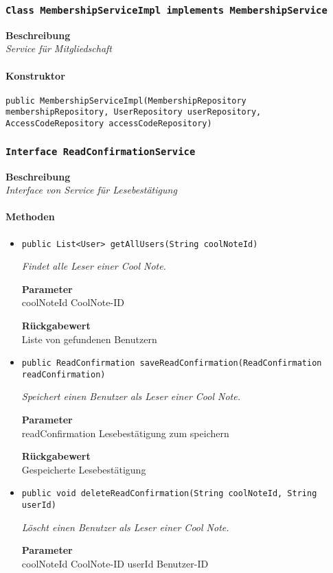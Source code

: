     \subsubsection{\texttt{Class MembershipServiceImpl implements MembershipService}}
    \textbf{Beschreibung} \\
    \textit{Service für Mitgliedschaft}
    \paragraph*{Konstruktor}
    \texttt{public MembershipServiceImpl(MembershipRepository membershipRepository, UserRepository userRepository, AccessCodeRepository accessCodeRepository)}
    \subsubsection{\texttt{Interface ReadConfirmationService}}
    \textbf{Beschreibung} \\
    \textit{Interface von Service für Lesebestätigung}
    \paragraph*{Methoden}
    \begin{itemize}
    	\item{\texttt{public List<User> getAllUsers(String coolNoteId)}}
    	
    	\textit{Findet alle Leser einer Cool Note.}
    	
    	\textbf{Parameter} \\
    	coolNoteId CoolNote-ID
    	
    	\textbf{Rückgabewert} \\
    	Liste von gefundenen Benutzern        \item{\texttt{public ReadConfirmation saveReadConfirmation(ReadConfirmation readConfirmation)}}
    	
    	\textit{Speichert einen Benutzer als Leser einer Cool Note.}
    	
    	\textbf{Parameter} \\
    	readConfirmation Lesebestätigung zum speichern
    	
    	\textbf{Rückgabewert} \\
    	Gespeicherte Lesebestätigung        \item{\texttt{public void deleteReadConfirmation(String coolNoteId, String userId)}}
    	
    	\textit{Löscht einen Benutzer als Leser einer Cool Note.}
    	
    	\textbf{Parameter} \\
    	coolNoteId CoolNote-ID
    	userId Benutzer-ID
    	
    	
    \end{itemize}
